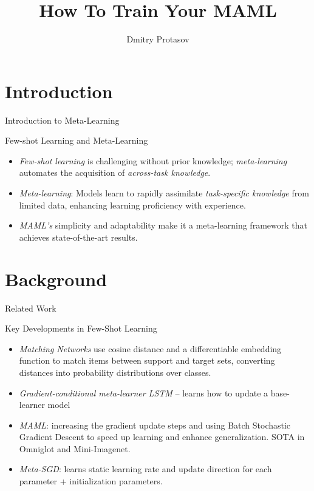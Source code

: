 \documentclass{beamer}
\title{How To Train Your MAML}
\author{Dmitry Protasov}
\institute{MIPT}
\begin{document}
\begin{frame}
    \titlepage
\end{frame}


\section{Introduction}
\begin{frame}{Introduction to Meta-Learning}
    \begin{block}{Few-shot Learning and Meta-Learning}
        \begin{itemize}
            \item \textit{Few-shot learning} is challenging without prior knowledge; \textit{meta-learning} automates the acquisition of \textit{across-task knowledge}.
            \item \textit{Meta-learning}: Models learn to rapidly assimilate \textit{task-specific knowledge} from limited data, enhancing learning proficiency with experience.
            \item \textit{MAML's} simplicity and adaptability make it a meta-learning framework that achieves state-of-the-art results.
        \end{itemize}
    \end{block}
\end{frame}

\section{Background}
\begin{frame}{Related Work}
    \begin{block}{Key Developments in Few-Shot Learning}
        \begin{itemize}
            \item \textit{Matching Networks} use cosine distance and a differentiable embedding function to match items between support and target sets, converting distances into probability distributions over classes.
            \item \textit{Gradient-conditional meta-learner LSTM} --  learns how to update a base-learner model%
            \item \textit{MAML}: increasing the gradient update steps and using Batch Stochastic Gradient Descent to speed up learning and enhance generalization. SOTA in Omniglot and Mini-Imagenet.
            \item \textit{Meta-SGD}: learns static learning rate and update direction for each parameter + initialization parameters.%
        \end{itemize}
    \end{block}
\end{frame}
\end{document}
